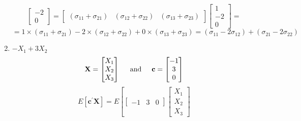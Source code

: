 \begin{enumerate}[label=(\alph*)]
\[\begin{bmatrix}
                    -2 \\
                    0
                \end{bmatrix}
                =
                \begin{bmatrix}
                    \left(\sigma_{11} + \sigma_{21}\right) &
                    \left(\sigma_{12} + \sigma_{22}\right) &
                    \left(\sigma_{13} + \sigma_{23}\right)
                \end{bmatrix}
                \begin{bmatrix}
                    1 \\
                    -2 \\
                    0
                \end{bmatrix}
                =
            \]
            \[
                =
                1 \times \left(\sigma_{11} + \sigma_{21}\right) - 2 \times \left(\sigma_{12} + \sigma_{22}\right)
                    + 0 \times \left(\sigma_{13} + \sigma_{23}\right)
                =
                (\sigma_{11} - 2 \sigma_{12}) + (\sigma_{21} - 2 \sigma_{22})
            \]
            \item $-X_1 + 3X_2$
            \[
                \textbf{X}
                =
                \begin{bmatrix}
                    X_1 \\
                    X_2 \\
                    X_3
                \end{bmatrix}
                \hspace{0.2in}\text{and}\hspace{0.2in}
                \textbf{c}
                =
                \begin{bmatrix}
                    -1 \\
                    3 \\
                    0
                \end{bmatrix}
            \]
            \[
                E\left[\textbf{c}^\prime\textbf{X}\right]
                =
                E\left[
                \begin{bmatrix}
                    -1 & 3 & 0
                \end{bmatrix}
                    \begin{bmatrix}
                    X_1 \\
                    X_2 \\
                    X_3
                \end{bmatrix}
\]
\end{enumerate}
